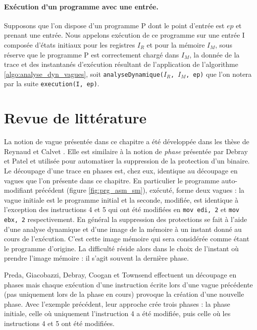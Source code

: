 \paragraph{Exécution d'un programme avec une entrée.}
Supposons que l'on dispose d'un programme P dont le point d'entrée est $ep$ et prenant une entrée.
Nous appelons exécution de ce programme sur une entrée I composée d'états initiaux pour les registres $I_R$ et pour la mémoire $I_M$, sous réserve que le programme P est correctement chargé dans $I_M$, la donnée de la trace et des instantanés d'exécution résultant de l'application de l'algorithme \ref{algo:analyse_dyn_vagues}, soit \texttt{analyseDynamique($I_R$, $I_M$, ep)} que l'on notera par la suite \texttt{execution(I, ep)}.

\section{Revue de littérature}
La notion de vague présentée dans ce chapitre a été développée dans les thèse de Reynaud \cite{Reynaud2010} et Calvet \cite{Calvet2013}.
Elle est similaire à la notion de \emph{phase} présentée par Debray et Patel \cite{DP10} et utilisée pour automatiser la suppression de la protection d'un binaire. Le découpage d'une trace en phases est, chez eux, identique au découpage en vagues que l'on présente dans ce chapitre.
En particulier le programme auto-modifiant précédent (figure \ref{fig:prg_asm_sm}), exécuté, forme deux vagues : la vague initiale est le programme initial et la seconde, modifiée, est identique à l'exception des instructions 4 et 5 qui ont été modifiées en \texttt{mov edi, 2} et \texttt{mov ebx, 2} respectivement.
En général la suppression des protections se fait à l'aide d'une analyse dynamique et d'une image de la mémoire à un instant donné au cours de l'exécution. C'est cette image mémoire qui sera considérée comme étant le programme d'origine. La difficulté réside alors dans le choix de l'instant où prendre l'image mémoire : il s'agit souvent la dernière phase.

Preda, Giacobazzi, Debray, Coogan et Townsend \cite{PGDCT10} effectuent un découpage en phases mais chaque exécution d'une instruction écrite lors d'une vague précédente (pas uniquement lors de la phase en cours) provoque la création d'une nouvelle phase.
Avec l'exemple précédent, leur approche crée trois phases : la phase initiale, celle où uniquement l'instruction 4 a été modifiée, puis celle où les instructions 4 et 5 ont été modifiées.

